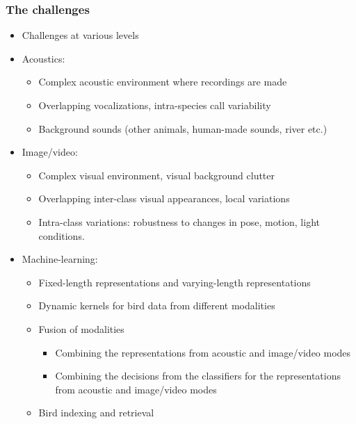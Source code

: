\documentclass[mathserif]{beamer}
\begin{document}
\begin{frame}
\frametitle{The challenges}
\begin{itemize}
\item<2-> Challenges at various levels
\item<3-> Acoustics:
	\begin{itemize}
	\item<4-> Complex acoustic environment where recordings are made
	\item<5-> Overlapping vocalizations, intra-species call variability
	\item<6-> Background sounds (other animals, human-made sounds, river etc.)
	\end{itemize}
\item<8-> Image/video: 
	\begin{itemize}
	\item<9-> Complex visual environment, visual background clutter
	\item<10-> Overlapping inter-class visual appearances, local variations  
	\item<11-> Intra-class variations: robustness to changes in pose, motion, light conditions.
	\end{itemize}
\item<12-> Machine-learning:
	\begin{itemize}
	\item<13-> Fixed-length representations and varying-length representations
	\item<14-> Dynamic kernels for bird data from different modalities
	\item<15-> Fusion of modalities
	\begin{itemize}
	    \item<16-> Combining the representations from acoustic and image/video modes
	    \item<17-> Combining the decisions from the classifiers for the representations from acoustic and image/video modes
	\end{itemize}
	\item<18-> Bird indexing and retrieval
	\end{itemize}
\end{itemize}
\end{frame}
\end{document}
